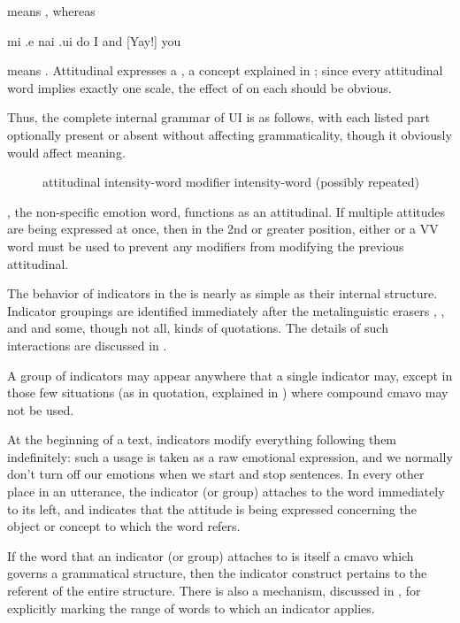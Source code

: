 {\noindent}means , whereas
\begin{example}
mi .e nai .ui do\n
I and  [Yay!] you
\end{example}

{\noindent}means . Attitudinal 
    expresses a , a concept explained in ; since every attitudinal word
    implies exactly one scale, the effect of  on each should
    be obvious. 

Thus, the complete internal grammar of UI is as follows,
    with each listed part optionally present or absent without
    affecting grammaticality, though it obviously would affect
    meaning.
\begin{description}
\item[] attitudinal  intensity-word  modifier  intensity-word  (possibly repeated)
\end{description}

, the non-specific emotion word, functions as an
    attitudinal. If multiple attitudes are being expressed at once,
    then in the 2nd or greater position, either  or a VV
    word must be used to prevent any modifiers from modifying the
    previous attitudinal.



The behavior of indicators in the  is
    nearly as simple as their internal structure. Indicator
    groupings are identified immediately after the metalinguistic
    erasers , , and  and some, though not all,
    kinds of quotations. The details of such interactions are
    discussed in .

A group of indicators may appear anywhere that a single
    indicator may, except in those few situations (as in 
    quotation, explained in )
    where compound cmavo may not be used.

At the beginning of a text, indicators modify everything
    following them indefinitely: such a usage is taken as a raw
    emotional expression, and we normally don't turn off our
    emotions when we start and stop sentences. In every other place
    in an utterance, the indicator (or group) attaches to the word
    immediately to its left, and indicates that the attitude is
    being expressed concerning the object or concept to which the
    word refers.

If the word that an indicator (or group) attaches to is
    itself a cmavo which governs a grammatical structure, then the
    indicator construct pertains to the referent of the entire
    structure. There is also a mechanism, discussed in , for explicitly marking the
    range of words to which an indicator applies.

